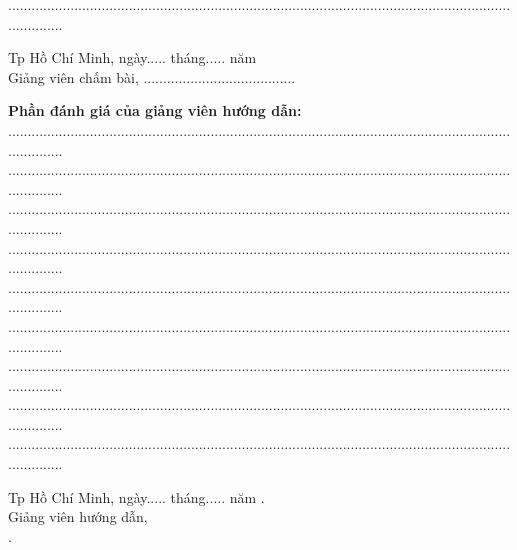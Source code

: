 	...............................................................................................................................................
\begin{center}
	\hspace*{5cm} Tp Hồ Chí Minh, ngày..... tháng..... năm \.\\
	\hspace*{5cm} Giảng viên chấm bài,
	\vspace*{1.2cm}
	\hspace*{5cm} .......................................
\end{center}
	\vspace*{0.5cm}
	\textbf{Phần đánh giá của giảng viên hướng dẫn:}\\
	...............................................................................................................................................\\
	...............................................................................................................................................\\
	...............................................................................................................................................\\
	...............................................................................................................................................\\
	...............................................................................................................................................\\
	...............................................................................................................................................\\
	...............................................................................................................................................\\
	...............................................................................................................................................\\
	...............................................................................................................................................
\begin{center}
	\hspace*{5cm} Tp Hồ Chí Minh, ngày..... tháng..... năm \nam.\\
	\hspace*{5cm} Giảng viên hướng dẫn,\\
	\vspace*{2cm}
	\hspace*{5cm} \gvhd.
\newpage
\end{center}
